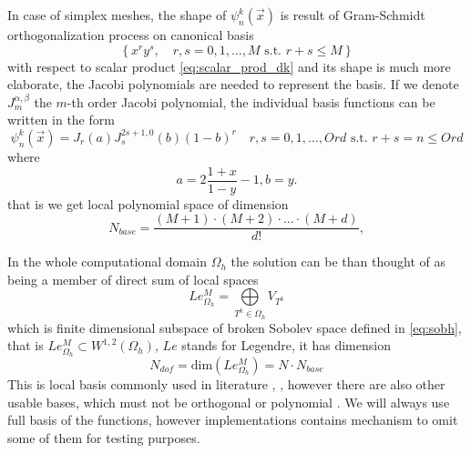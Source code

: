In case of simplex meshes, the shape of $\psi_n^k(\vec{x})$ is result of 
Gram-Schmidt orthogonalization process on canonical basis 
$$
\left\{ x^ry^s,  \quad r, s = 0,1, \dots, M \text{ s.t. } r + s \leq M\right\}
$$
with respect to scalar product \eqref{eq:scalar_prod_dk}
and its shape is much more elaborate, the Jacobi polynomials are needed to 
represent the basis. If we denote $J^{\alpha, \beta}_m$ the $m$-th order 
Jacobi polynomial, the individual basis functions can be written in the form 
\cite{Hesthaven2008}
\begin{equation}
	\psi_n^k(\vec{x}) = J_r(a)J^{2s+1, 0}_s(b)(1 - b)^r\quad r, s = 0,1, \dots, 
	Ord \text{ s.t. } r + s = n \leq Ord
\end{equation}
where
\begin{equation}
	a = 2 \frac{1 + x}{1 - y} - 1, b = y.
\end{equation}
that is we get local polynomial space of dimension
\begin{equation}
N_{base} =  \frac{(M + 1) \cdot (M + 2) \cdot ... \cdot (M + d)}{d!},
\end{equation}

In the whole computational domain $\Omega_h$ the solution can be than thought 
of as being a member of direct sum of local spaces
\begin{equation}
	Le_{\Omega_h}^{M} = \bigoplus\limits_{T^k \in \Omega_h} V_{T^k}
\end{equation}
which is finite dimensional subspace of broken Sobolev space defined in 
\eqref{eq:sobh}, 
that is $Le_{\Omega_h}^{M} \subset  W^{1,2}(\Omega_h)$, $Le$ stands for Legendre, it has 
dimension
\begin{equation}\label{eq:dim_legh}
	N_{dof} = \text{dim}(Le_{\Omega_h}^{M}) = N\cdot N_{base}
\end{equation}
This is local basis commonly used in literature \cite{Hesthaven2008}, 
\cite{Bokhove2008}, however there are also other usable bases, which must not 
be orthogonal or polynomial \cite{Yuan2006}. We will always use full 
basis of the functions, however implementations contains mechanism to omit some 
of them for testing purposes.

\newpage
